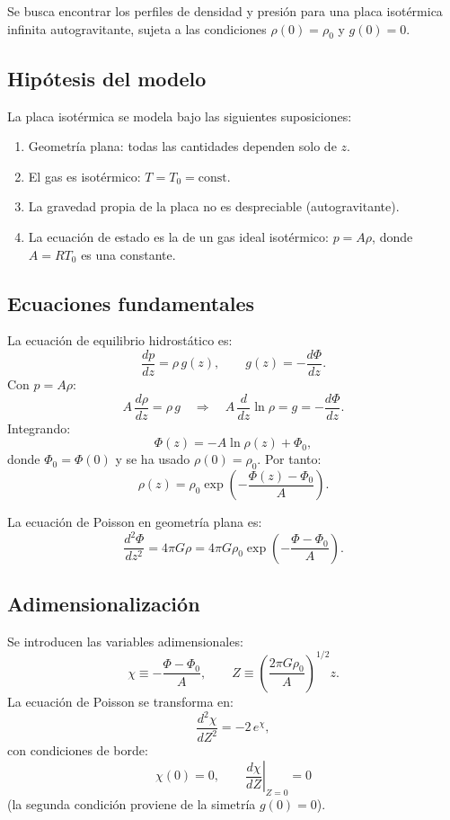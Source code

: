 Se busca encontrar los perfiles de densidad y presión para una placa isotérmica infinita autogravitante, sujeta a las condiciones $\rho(0) = \rho_0$ y $g(0) = 0$.

\subsection{Hipótesis del modelo}

La placa isotérmica se modela bajo las siguientes suposiciones:
\begin{enumerate}
    \item Geometría plana: todas las cantidades dependen solo de $z$.
    \item El gas es isotérmico: $T = T_0 = \text{const}$.
    \item La gravedad propia de la placa no es despreciable (autogravitante).
    \item La ecuación de estado es la de un gas ideal isotérmico: $p = A\rho$, donde $A = RT_0$ es una constante.
\end{enumerate}

\subsection{Ecuaciones fundamentales}

La ecuación de equilibrio hidrostático es:
$$
\frac{dp}{dz} = \rho\,g(z), \qquad g(z) = -\frac{d\Phi}{dz}.
$$
Con $p = A\rho$:
$$
A\,\frac{d\rho}{dz} = \rho\,g \quad \Longrightarrow \quad A\,\frac{d}{dz}\ln\rho = g = -\frac{d\Phi}{dz}.
$$
Integrando:
$$
\Phi(z) = -A\ln\rho(z) + \Phi_0,
$$
donde $\Phi_0 = \Phi(0)$ y se ha usado $\rho(0) = \rho_0$. Por tanto:
$$
\rho(z) = \rho_0\exp\!\left(-\frac{\Phi(z) - \Phi_0}{A}\right).
$$

La ecuación de Poisson en geometría plana es:
$$
\frac{d^2\Phi}{dz^2} = 4\pi G\rho = 4\pi G\rho_0\exp\!\left(-\frac{\Phi - \Phi_0}{A}\right).
$$

\subsection{Adimensionalización}

Se introducen las variables adimensionales:
$$
\chi \equiv -\frac{\Phi - \Phi_0}{A}, \qquad Z \equiv \left(\frac{2\pi G\rho_0}{A}\right)^{1/2}z.
$$
La ecuación de Poisson se transforma en:
$$
\frac{d^2\chi}{dZ^2} = -2\,e^{\chi},
$$
con condiciones de borde:
$$
\chi(0) = 0, \qquad \left.\frac{d\chi}{dZ}\right|_{Z=0} = 0
$$
(la segunda condición proviene de la simetría $g(0) = 0$).


